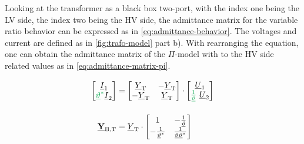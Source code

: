 Looking at the transformer as a black box two-port, with the index one being the \ac{LV} side, the index two being the \ac{HV} side, the admittance matrix for the variable ratio behavior can be expressed as in \autoref{eq:admittance-behavior}. 
The voltages and current are defined as in \autoref{fig:trafo-model} part b). 
With rearranging the equation, one can obtain the admittance matrix of the $\Pi$-model with to the \acs{HV} side related values as in \autoref{eq:admittance-matrix-pi}. \autocite{milano_2010,burlakin_2024}

\begin{align}
    \begin{bmatrix}
        \underline{I}_1 \\ {\color{ees_green}\underline{\vartheta}^*} \underline{I}_2
    \end{bmatrix}&= 
    \begin{bmatrix}
        \underline{Y}_\mathrm{T} & -\underline{Y}_\mathrm{T} \\
        -\underline{Y}_\mathrm{T} & \underline{Y}_\mathrm{T}
    \end{bmatrix} \cdot
    \begin{bmatrix}
        \underline{U}_1 \\ {\color{ees_green}\frac{1}{\underline{\vartheta}}}~\underline{U}_2
    \end{bmatrix} \label{eq:admittance-behavior} \\[12pt]
    \underline{\mab{Y}}_\mathrm{\Pi,T}&=\underline{Y}_\mathrm{T} \cdot
    \begin{bmatrix}
        1 & -\frac{1}{\underline{\vartheta}} \\
        -\frac{1}{\underline{\vartheta}^*} & \frac{1}{\underline{\vartheta}\underline{\vartheta}^*} 
    \end{bmatrix} \label{eq:admittance-matrix-pi}
\end{align}


